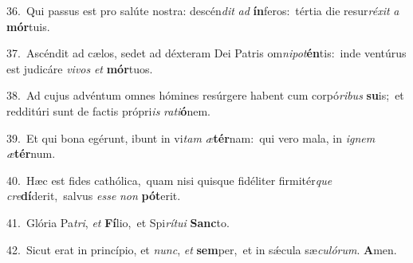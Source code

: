 {\numbfont\textcolor{\numbcolor}{36.}}~Qui passus est pro salúte nostra: descén\textit{dit} \textit{ad} \textbf{ín}\-feros:~\star tértia die resur\-\textit{ré}\-\textit{xit} \textit{a} \textbf{mór}\-tuis.\par
{\numbfont\textcolor{\numbcolor}{37.}}~Ascéndit ad cælos, sedet ad déxteram Dei Patris om\-\textit{ni}\-\textit{pot}\textbf{én}tis:~\star inde ventúrus est judicáre \textit{vi}\-\textit{vos} \textit{et} \textbf{mór}\-tuos.\par
{\numbfont\textcolor{\numbcolor}{38.}}~Ad cujus advéntum omnes hómines resúrgere habent cum corpó\-\textit{ri}\-\textit{bus} \textbf{su}\-is;~\star et redditúri sunt de factis própri\textit{is} \textit{ra}\-\textit{ti}\textbf{ó}nem.\par
{\numbfont\textcolor{\numbcolor}{39.}}~Et qui bona egérunt, ibunt in vi\textit{tam} \textit{æ}\-\textbf{tér}nam:~\star qui vero mala, in \textit{i}\-\textit{gnem} \textit{æ}\-\textbf{tér}num.\par
{\numbfont\textcolor{\numbcolor}{40.}}~Hæc est fides cathólica,~\dagger quam nisi quisque fidéliter firmitér\textit{que} \textit{cre}\-\textbf{dí}derit,~\star salvus \textit{es}\-\textit{se} \textit{non} \textbf{pót}\-erit.\par
{\numbfont\textcolor{\numbcolor}{41.}}~Glória Pa\-\textit{tri}\-, \textit{et} \textbf{Fí}\-lio,~\star et Spi\-\textit{rí}\-\textit{tu}\textit{i} \textbf{Sanc}\-to.\par
{\numbfont\textcolor{\numbcolor}{42.}}~Sicut erat in princípio, et \textit{nunc}\-, \textit{et} \textbf{sem}\-per,~\star et in sǽcula sæ\-\textit{cu}\-\textit{ló}\textit{rum}. \textbf{A}\-men.\par
